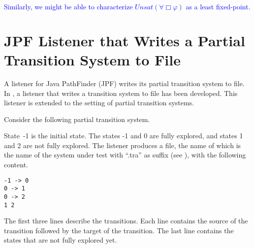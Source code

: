 \documentclass[12pt]{article}
\newcommand{\always}{\Box}
\theoremstyle{definition}
\begin{document}
\textcolor{blue}{Similarly, we might be able to characterize $\mathit{Unsat}(\forall \always \varphi)$ as a least fixed-point.}

\section{JPF Listener that Writes a Partial Transition System to File}

A listener for Java PathFinder (JPF) writes its partial transition system to file.  In \cite[Section~7.3]{B20}, a listener that writes a transition system to file has been developed.  This listener is extended to the setting of partial transition systems.

Consider the following partial transition system.
\begin{center}
\end{center}
State~-1 is the initial state.  The states -1 and 0 are fully explored, and  states 1 and 2 are not fully explored.  The listener produces a file, the name of which is the name of the system under test with ``.tra'' as suffix (see \cite[Section 7.4]{B20}), with the following content.
\begin{verbatim}
-1 -> 0
0 -> 1
0 -> 2
1 2
\end{verbatim}
The first three lines describe the transitions.  Each line contains the source of the transition followed by the target of the transition.  The last line contains the states that are not fully explored yet.



\end{document}
